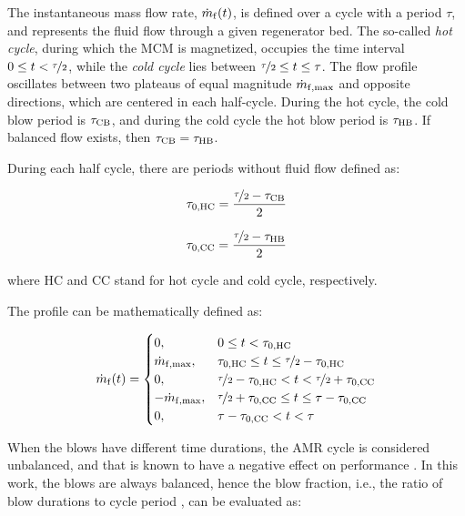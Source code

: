\documentclass[referee]{svjour3}
\begin{document}
The instantaneous mass flow rate, \(\dot{m}_{\mathrm{f}}(t)\), is defined over a cycle with a period \(\tau\), and represents the fluid flow through a given regenerator bed. The so-called \emph{hot cycle}, during which the MCM is magnetized, occupies the time interval \(0 \le t < \nicefrac{\tau}{2}\), while the \emph{cold cycle} lies between \(\nicefrac{\tau}{2} \le t \le \tau\). The flow profile oscillates between two plateaus of equal magnitude
\(\dot{m}_{\mathrm{f,max}}\) and opposite directions, which are centered in each half-cycle. During the hot cycle, the cold
blow period is \(\tau_{\mathrm{CB}}\), and during the cold cycle the hot blow period is \(\tau_{\mathrm{HB}}\). If balanced flow exists, then \(\tau_{\mathrm{CB}} = \tau_{\mathrm{HB}}\).


During each half cycle, there are periods without  fluid flow defined as:

\begin{equation}
\label{eq:48}
\tau_{\mathrm{0,HC}} = \frac{\nicefrac{\tau}{2} - \tau_{\mathrm{CB}}}{2}
\end{equation}

\begin{equation}
\label{eq:49}
\tau_{\mathrm{0,CC}} = \frac{\nicefrac{\tau}{2} - \tau_{\mathrm{HB}}}{2}
\end{equation}

where HC and CC stand for hot cycle and cold cycle, respectively.


The profile can be mathematically defined as:

\begin{equation}
\dot{m}_{\mathrm{f}}(t)=
\begin{cases}
0, & 0 \le t < \tau_{\mathrm{0,HC}} \\
\dot{m}_{\mathrm{f,max}}, & \tau_{\mathrm{0,HC}} \le t \le \nicefrac{\tau}{2} - \tau_{\mathrm{0,HC}} \\
0, & \nicefrac{\tau}{2} - \tau_{\mathrm{0,HC}} < t < \nicefrac{\tau}{2} + \tau_{\mathrm{0,CC}} \\
-\dot{m}_{\mathrm{f,max}}, & \nicefrac{\tau}{2} + \tau_{\mathrm{0,CC}} \le t \le \tau - \tau_{\mathrm{0,CC}} \\
0, &  \tau - \tau_{\mathrm{0,CC}} <  t < \tau \\
\end{cases}
\label{eq:50}
\end{equation}

When the blows have different time durations, the AMR cycle is considered unbalanced, and that is known to have a negative effect on performance \cite{bib:eriksen16_effec,bib:nakashima18-influen-exp}. In this work, the blows are always balanced, hence the blow fraction, i.e., the ratio of blow durations to cycle period \cite{bib:nakashima18-influen-exp}, can be evaluated as:
\end{document}
